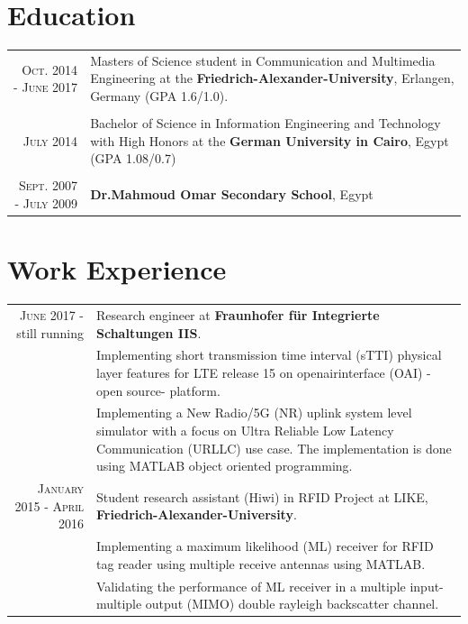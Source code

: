 \documentclass[a4paper,10pt]{article}
\begin{document}
\section{Education}
\begin{tabular}{r|p{9cm}}	
\textsc{Oct.} 2014 - \textsc{June} 2017 & Masters of Science student in Communication and Multimedia Engineering at the {\bf Friedrich-Alexander-University}, Erlangen, Germany (GPA 1.6/1.0). \\
& \\

 \textsc{July} 2014 & Bachelor of Science in Information Engineering and Technology with High Honors at the {\bf German University in Cairo}, Egypt (GPA 1.08/0.7)\\
& \\
 \textsc{Sept.} 2007 - \textsc{July} 2009 & {\bf Dr.Mahmoud Omar Secondary School}, Egypt
\end{tabular}

\section{Work Experience}
\begin{tabular}{r|p{9cm}}
	\textsc{June} 2017 - still running & Research engineer at {\bf Fraunhofer für Integrierte Schaltungen IIS}.\\
	& Implementing short transmission time interval (sTTI) physical layer features for LTE release 15 on openairinterface (OAI) -open source- platform. \\
	& Implementing a New Radio/5G (NR) uplink system level simulator with a focus on Ultra Reliable Low Latency Communication (URLLC) use case. The implementation is done using MATLAB object oriented programming.\\	
	\textsc{January} 2015 - \textsc{April} 2016 & Student research assistant (Hiwi) in RFID Project at LIKE, {\bf Friedrich-Alexander-University}.\\
	& Implementing a maximum likelihood (ML) receiver for RFID tag reader using multiple receive antennas using MATLAB. \\
	& Validating the performance of ML receiver in a multiple input-multiple output (MIMO) double rayleigh backscatter channel. \\ 
\end{tabular}
\end{document}
